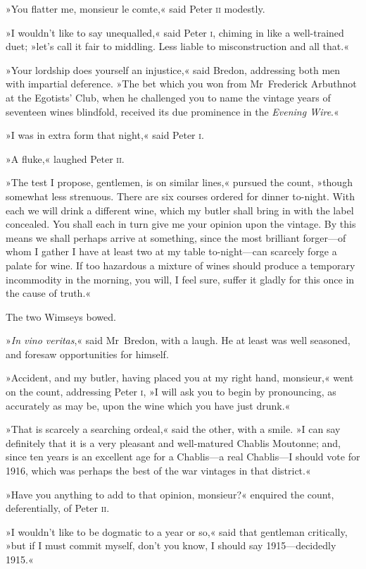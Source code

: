 »You flatter me, monsieur le comte,« said Peter \textsc{ii} modestly.

»I wouldn't like to say unequalled,« said Peter \textsc{i}, chiming in like a well-trained duet; »let's call it fair to middling. Less liable to misconstruction and all that.«

»Your lordship does yourself an injustice,« said Bredon, addressing both men with impartial deference. »The bet which you won from Mr~Frederick Arbuthnot at the Egotists' Club, when he challenged you to name the vintage years of seventeen wines blindfold, received its due prominence in the \textit{Evening Wire}.«

»I was in extra form that night,« said Peter \textsc{i}.

»A fluke,« laughed Peter \textsc{ii}.

»The test I propose, gentlemen, is on similar lines,« pursued the count, »though somewhat less strenuous. There are six courses ordered for dinner to-night. With each we will drink a different wine, which my butler shall bring in with the label concealed. You shall each in turn give me your opinion upon the vintage. By this means we shall perhaps arrive at something, since the most brilliant forger—of whom I gather I have at least two at my table to-night—can scarcely forge a palate for wine. If too hazardous a mixture of wines should produce a temporary incommodity in the morning, you will, I feel sure, suffer it gladly for this once in the cause of truth.«

The two Wimseys bowed.

»\textit{In vino veritas},« said Mr~Bredon, with a laugh. He at least was well seasoned, and foresaw opportunities for himself.

»Accident, and my butler, having placed you at my right hand, monsieur,« went on the count, addressing Peter \textsc{i}, »I will ask you to begin by pronouncing, as accurately as may be, upon the wine which you have just drunk.«

»That is scarcely a searching ordeal,« said the other, with a smile. »I can say definitely that it is a very pleasant and well-matured Chablis Moutonne; and, since ten years is an excellent age for a Chablis—a real Chablis—I should vote for 1916, which was perhaps the best of the war vintages in that district.«

»Have you anything to add to that opinion, monsieur?« enquired the count, deferentially, of Peter \textsc{ii}.

»I wouldn't like to be dogmatic to a year or so,« said that gentleman critically, »but if I must commit myself, don't you know, I should say 1915—decidedly 1915.«

